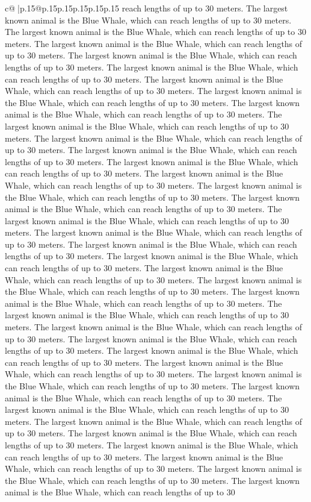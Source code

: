 \documentclass{article}
\begin{document}
{\begin{supertabular}{c@{$\;$}|p{.15\linewidth}@{}p{.15\linewidth}p{.15\linewidth}p{.15\linewidth}p{.15\linewidth}p{.15\linewidth}}
{{{reach lengths of up to 30 meters. The largest known animal is the Blue Whale, which can reach lengths of up to 30 meters. The largest known animal is the Blue Whale, which can reach lengths of up to 30 meters. The largest known animal is the Blue Whale, which can reach lengths of up to 30 meters. The largest known animal is the Blue Whale, which can reach lengths of up to 30 meters. The largest known animal is the Blue Whale, which can reach lengths of up to 30 meters. The largest known animal is the Blue Whale, which can reach lengths of up to 30 meters. The largest known animal is the Blue Whale, which can reach lengths of up to 30 meters. The largest known animal is the Blue Whale, which can reach lengths of up to 30 meters. The largest known animal is the Blue Whale, which can reach lengths of up to 30 meters. The largest known animal is the Blue Whale, which can reach lengths of up to 30 meters. The largest known animal is the Blue Whale, which can reach lengths of up to 30 meters. The largest known animal is the Blue Whale, which can reach lengths of up to 30 meters. The largest known animal is the Blue Whale, which can reach lengths of up to 30 meters. The largest known animal is the Blue Whale, which can reach lengths of up to 30 meters. The largest known animal is the Blue Whale, which can reach lengths of up to 30 meters. The largest known animal is the Blue Whale, which can reach lengths of up to 30 meters. The largest known animal is the Blue Whale, which can reach lengths of up to 30 meters. The largest known animal is the Blue Whale, which can reach lengths of up to 30 meters. The largest known animal is the Blue Whale, which can reach lengths of up to 30 meters. The largest known animal is the Blue Whale, which can reach lengths of up to 30 meters. The largest known animal is the Blue Whale, which can reach lengths of up to 30 meters. The largest known animal is the Blue Whale, which can reach lengths of up to 30 meters. The largest known animal is the Blue Whale, which can reach lengths of up to 30 meters. The largest known animal is the Blue Whale, which can reach lengths of up to 30 meters. The largest known animal is the Blue Whale, which can reach lengths of up to 30 meters. The largest known animal is the Blue Whale, which can reach lengths of up to 30 meters. The largest known animal is the Blue Whale, which can reach lengths of up to 30 meters. The largest known animal is the Blue Whale, which can reach lengths of up to 30 meters. The largest known animal is the Blue Whale, which can reach lengths of up to 30 meters. The largest known animal is the Blue Whale, which can reach lengths of up to 30 meters. The largest known animal is the Blue Whale, which can reach lengths of up to 30 meters. The largest known animal is the Blue Whale, which can reach lengths of up to 30 meters. The largest known animal is the Blue Whale, which can reach lengths of up to 30 meters. The largest known animal is the Blue Whale, which can reach lengths of up to 30 meters. The largest known animal is the Blue Whale, which can reach lengths of up to 30 meters. The largest known animal is the Blue Whale, which can reach lengths of up to 30 }}}
\end{supertabular}}
\end{document}

